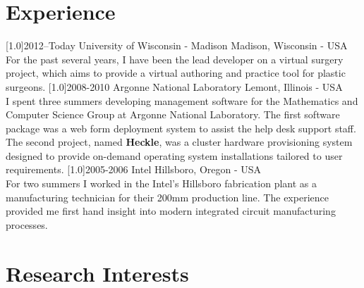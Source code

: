 \documentclass{cv-style}     %
\begin{document}
\section{Experience}
  \vspace{-0.2cm}
\begin{entrylist}
\entry
  {\scalebox{.8}[1.0]{2012--Today}}
  {University of Wisconsin - Madison}
  {Madison, Wisconsin - USA}
  {\\    
    For the past several years, I have been the
    lead developer on a virtual surgery project,
    which aims to provide a virtual authoring and
    practice tool for plastic surgeons. 
}
 \entry
{\scalebox{.8}[1.0]{2008-2010}}
{Argonne National  Laboratory}
{Lemont, Illinois - USA}
{\\
  I spent three summers developing management
  software for the Mathematics and Computer
  Science Group at Argonne National
  Laboratory. The first software package was a web
  form deployment system to assist the help desk
  support staff. The second project, named
  \textbf{Heckle}, was a cluster hardware
  provisioning system designed to provide
  on-demand operating system installations
  tailored to user requirements.
  }
 \entry
{\scalebox{.8}[1.0]{2005-2006}}
 {Intel}
 {Hillsboro, Oregon - USA}
{\\
 For two summers I worked in the Intel's Hillsboro
 fabrication plant as a manufacturing technician
 for their 200mm production line. The experience
 provided me first hand insight into modern
 integrated circuit manufacturing processes. 
  }

\end{entrylist}

\section{Research Interests}
  \vspace{-0.2cm}
\end{document}
